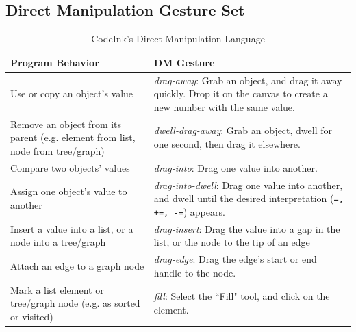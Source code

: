 \subsection{Direct Manipulation Gesture Set}

\begin{table}[!b]
\renewcommand{\arraystretch}{1.75}
\caption{CodeInk's Direct Manipulation Language}
\label{tbl:language_table}
\centering
\begin{tabular}{|p{3.8cm} |p{3.8cm} |}
\hline
\textbf{Program Behavior} & \textbf{DM Gesture} \\
\hline
Use or copy an object's value & {\em drag-away}: Grab an object, and drag it
away quickly.
Drop it on the canvas to create a new number with the same value.
\\
\hline
Remove an object from its parent (e.g. element from list, node from tree/graph) & {\em dwell-drag-away}: Grab an object, dwell for one second, then
drag it elsewhere.
\\
\hline
Compare two objects' values & {\em drag-into}: Drag one value into another.
\\
\hline
Assign one object's value to another &
{\em drag-into-dwell}: Drag one value into another, and
dwell until the desired interpretation (\texttt{=, +=, -=}) appears. \\
\hline
Insert a value into a list, or a node into a tree/graph
& {\em drag-insert}: Drag the value into a gap in the list, or the node to the
tip of an edge
\\

\hline
Attach an edge to a graph node
& {\em drag-edge}: Drag the edge's start or end handle to the node.
\\

\hline
Mark a list element or tree/graph node (e.g. as sorted or visited) &
{\em fill}: Select the ``Fill" tool, and click on the element. \\
\hline
\end{tabular}
\end{table}


